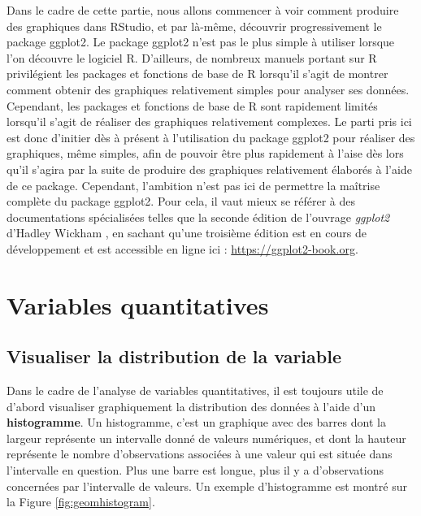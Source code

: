 \documentclass[
  french,
]{book}
\begin{document}
Dans le cadre de cette partie, nous allons commencer à voir comment produire des graphiques dans RStudio, et par là-même, découvrir progressivement le package ggplot2. Le package ggplot2 n'est pas le plus simple à utiliser lorsque l'on découvre le logiciel R. D'ailleurs, de nombreux manuels portant sur R privilégient les packages et fonctions de base de R lorsqu'il s'agit de montrer comment obtenir des graphiques relativement simples pour analyser ses données. Cependant, les packages et fonctions de base de R sont rapidement limités lorsqu'il s'agit de réaliser des graphiques relativement complexes. Le parti pris ici est donc d'initier dès à présent à l'utilisation du package ggplot2 pour réaliser des graphiques, même simples, afin de pouvoir être plus rapidement à l'aise dès lors qu'il s'agira par la suite de produire des graphiques relativement élaborés à l'aide de ce package. Cependant, l'ambition n'est pas ici de permettre la maîtrise complète du package ggplot2. Pour cela, il vaut mieux se référer à des documentations spécialisées telles que la seconde édition de l'ouvrage \emph{ggplot2} d'Hadley Wickham \autocite*{wickhamGgplot22016}, en sachant qu'une troisième édition est en cours de développement et est accessible en ligne ici : \url{https://ggplot2-book.org}.

\hypertarget{variables-quantitatives}{%
\section{Variables quantitatives}\label{variables-quantitatives}}

\hypertarget{visualiser-la-distribution-de-la-variable}{%
\subsection{Visualiser la distribution de la variable}\label{visualiser-la-distribution-de-la-variable}}

Dans le cadre de l'analyse de variables quantitatives, il est toujours utile de d'abord visualiser graphiquement la distribution des données à l'aide d'un \textbf{histogramme}. Un histogramme, c'est un graphique avec des barres dont la largeur représente un intervalle donné de valeurs numériques, et dont la hauteur représente le nombre d'observations associées à une valeur qui est située dans l'intervalle en question. Plus une barre est longue, plus il y a d'observations concernées par l'intervalle de valeurs. Un exemple d'histogramme est montré sur la Figure \ref{fig:geomhistogram}.
\end{document}
